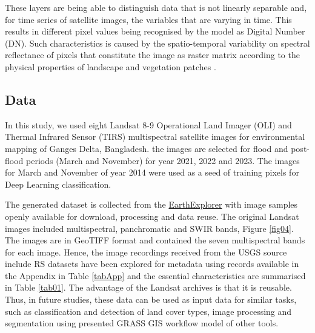\documentclass[water,article,submit,pdftex,moreauthors]{Definitions/mdpi}
\begin{document}
These layers are being able to distinguish data that is not linearly separable and, for time series of satellite images, the variables that are varying in time. This results in different pixel values being recognised by the model as Digital Number (DN). Such characteristics is caused by the spatio-temporal variability on spectral reflectance of pixels that constitute the image as raster matrix according to the physical properties of landscape and vegetation patches \cite{rs16010184,HUANG20181915,YIN2021102514}. 

\subsection{Data}
In this study, we used eight Landsat 8-9 Operational Land Imager (OLI) and Thermal Infrared Sensor (TIRS) multispectral satellite images for environmental mapping of Ganges Delta, Bangladesh. the images are selected for flood and post-flood periods (March and November) for year 2021, 2022 and 2023. The images for March and November of year 2014 were used as a seed of training pixels for Deep Learning classification. 

The generated dataset is collected from the \href{https://earthexplorer.usgs.gov/}{EarthExplorer} \cite{USGSPublication} with image samples openly available for download, processing and data reuse. The original Landsat images included multispectral, panchromatic and SWIR bands, Figure \ref{fig04}. The images are in GeoTIFF format and contained the seven multispectral bands for each image. Hence, the image recordings received from the USGS source include RS datasets have been explored for metadata using records available in the Appendix in Table \ref{tabApp} and the essential characteristics are summarised in Table \ref{tab01}. The advantage of the Landsat archives is that it is reusable. Thus, in future studies, these data can be used as input data for similar tasks, such as classification and detection of land cover types, image processing and segmentation using presented GRASS GIS workflow model of other tools. 
\end{document}
